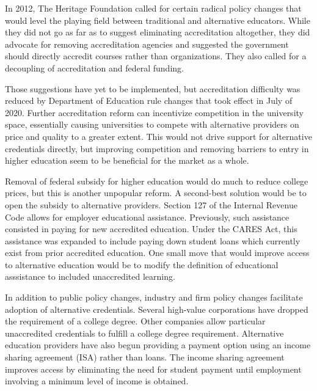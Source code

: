 \documentclass[review]{elsarticle}
\begin{document}
In 2012, The Heritage Foundation called for certain radical policy changes that would level the playing field between traditional and alternative educators.
While they did not go as far as to suggest eliminating accreditation altogether,
they did advocate for removing accreditation agencies and suggested the government should directly accredit courses rather than organizations. %
They also called for a decoupling of accreditation and federal funding.

Those suggestions have yet to be implemented, but accreditation difficulty was reduced by Department of Education rule changes that
took effect in July of 2020. %
Further accreditation reform can incentivize competition in the university space,
essentially causing universities to compete with alternative providers on price and quality to a greater extent.
This would not drive support for alternative credentials directly, but improving competition and removing
barriers to entry in higher education seem to be beneficial for the market as a whole.


Removal of federal subsidy for higher education would do much to reduce college prices, but this is another unpopular reform.
A second-best solution would be to open the subsidy to alternative providers.
Section 127 of the Internal Revenue Code allows for employer educational assistance.
Previously, such assistance consisted in paying for new accredited education.
Under the CARES Act, this assistance was expanded to include paying down student loans which currently exist from prior accredited education.
One small move that would improve access to alternative education would be to modify the definition of educational asssistance to included unaccredited learning.

In addition to public policy changes, industry and firm policy changes facilitate adoption of alternative credentials.
Several high-value corporations have dropped the requirement of a college degree. %
Other companies allow particular unaccredited credentials to fulfill a college degree requirement. %
Alternative education providers have also begun providing a payment option using an income sharing agreement (ISA) rather than loans.
The income sharing agreement improves access by eliminating the need for student payment until employment involving a minimum level of income is obtained.
\end{document}

